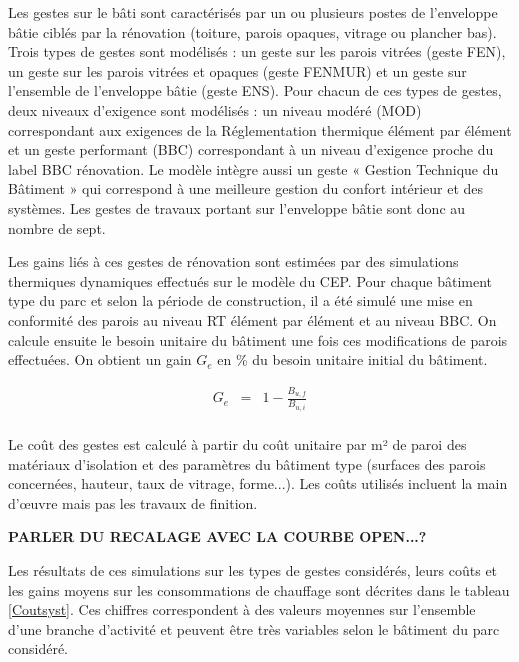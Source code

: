 \documentclass[10.5pt,a4paper]{article}
\begin{document}
{Les gestes sur le bâti sont caractérisés par un ou plusieurs postes de l’enveloppe bâtie ciblés par la rénovation (toiture, parois opaques, vitrage ou plancher bas). Trois types de gestes sont modélisés : un geste sur les parois vitrées (geste FEN), un geste sur les parois vitrées et opaques  (geste FENMUR) et un geste sur l'ensemble de l'enveloppe bâtie (geste ENS). Pour chacun de ces types de gestes, deux niveaux d'exigence sont modélisés : un niveau modéré (MOD) correspondant aux exigences de la Réglementation thermique élément par élément et un geste performant (BBC) correspondant à un niveau d'exigence proche du label BBC rénovation. 
Le modèle intègre aussi un geste « Gestion Technique du Bâtiment » qui correspond à une meilleure gestion du confort intérieur et des systèmes. 
Les gestes de travaux portant sur l’enveloppe bâtie sont donc au nombre de sept. 

Les gains liés à ces gestes de rénovation sont estimées par des simulations thermiques dynamiques effectués sur le modèle du CEP. Pour chaque bâtiment type du parc et selon la période de construction, il a été simulé une mise en conformité des parois au niveau RT élément par élément et au niveau BBC. On calcule ensuite le besoin unitaire du bâtiment une fois ces modifications de parois effectuées. On obtient un gain  $G_e$ en \% du besoin unitaire initial du bâtiment. 

\begin{eqnarray}
 G_e &= & 1-\frac{B_{u,f}}{B_{u,i}} \\
\end{eqnarray}


Le coût des gestes est calculé à partir du coût unitaire par m² de paroi des matériaux d'isolation et des paramètres du bâtiment type (surfaces des parois concernées, hauteur, taux de vitrage, forme...). Les coûts utilisés incluent la main d’œuvre mais pas les travaux de finition. 

\textbf{ PARLER DU RECALAGE AVEC LA COURBE OPEN...?}

Les résultats de ces simulations sur les types de gestes considérés, leurs coûts et les gains moyens sur les consommations de chauffage sont décrites dans le tableau \ref{Coutsyst}. Ces chiffres correspondent à des valeurs moyennes sur l’ensemble d'une branche d'activité et peuvent être très variables selon le bâtiment du parc considéré. 

}
\end{document}

